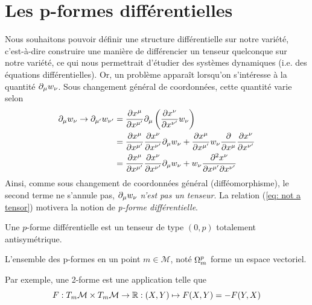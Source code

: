 \section{Les p-formes différentielles}
Nous souhaitons pouvoir définir une structure différentielle sur notre variété, c'est-à-dire construire une manière de différencier un tenseur quelconque sur notre variété, ce qui nous permettrait d'étudier des systèmes dynamiques (i.e. des équations différentielles). Or, un problème apparaît lorsqu'on s'intéresse à la quantité $\partial_\mu w_\nu$. Sous changement général de coordonnées, cette quantité varie selon
\begin{align}
\nonumber
    \label{eq: not a tensor}
    \partial_\mu w_\nu \to \partial_{\mu'} w_{\nu'} &= \frac{\partial x^\mu}{\partial x^{\mu'}} \partial_\mu \left( \frac{\partial x^\nu}{\partial x^{\nu'}} w_\nu \right)\\
    \nonumber
    & = \frac{\partial x^\mu}{\partial x^{\mu'}} \frac{\partial x^\nu}{\partial x^{\nu'}} \partial_\mu w_\nu + \frac{\partial x^\mu}{\partial x^{\mu'}} w_\nu \frac{\partial}{\partial x^\mu}  \frac{\partial x^\nu}{\partial x^{\nu'}}\\
    &= \frac{\partial x^\mu}{\partial x^{\mu'}} \frac{\partial x^\nu}{\partial x^{\nu'}} \partial_\mu w_\nu + w_\nu  \frac{\partial^2 x^\nu}{\partial x^{\mu'}\partial x^{\nu'}}
\end{align}
Ainsi, comme sous changement de coordonnées général (difféomorphisme), le second terme ne s'annule pas, $\partial_\mu w_\nu$ \emph{n'est pas un tenseur}. La relation (\ref{eq: not a tensor}) motivera la notion de \emph{p-forme différentielle}.
\begin{theoremframe}
    \begin{defi}
        Une $p$-forme différentielle est un tenseur de type $(0,p)$ totalement antisymétrique.
    \end{defi}
\end{theoremframe}
\begin{propri}
    L'ensemble des p-formes en un point $m\in \mathcal{M}$, noté $\displaystyle\Omega\indices*{^p_m}$ forme un espace vectoriel.
\end{propri}

Par exemple, une 2-forme est une application telle que 
\begin{equation}
    F: T_m\mathcal{M}\times T_m\mathcal{M}\rightarrow \mathbb{R}: (X, Y)\mapsto F(X, Y) = -F(Y, X)
\end{equation}

